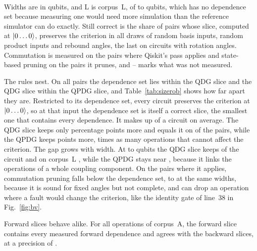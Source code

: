 \begin{table}[t]
  \centering
  \caption{Slice size by circuit width (RQ1) and slices that stay correct under other inputs (RQ2)}
  \label{tab:sizerob}
  \footnotesize\setlength{\tabcolsep}{1.9pt}\renewcommand{\arraystretch}{1.12}
  \\[3pt]
  \begin{minipage}{\columnwidth}\footnotesize
  Widths are in qubits, and L is corpus~L, of \numSubjLMinQubits{} to \numSubjLMaxQubits{} qubits, which has no dependence set because measuring one would
  need more simulation than the reference simulator can do exactly. Still correct is the share of pairs whose slice, computed at
  $\lvert 0\dots0\rangle$, preserves the criterion in all \numRobDraws{} draws of random basis inputs, random product inputs
  and rebound angles, the last on circuits with rotation angles. Commutation is measured on the \numLcqApplicable{}
  pairs where Qiskit's pass applies and state-based pruning on the \numHThreePrunedN{} pairs it prunes, and -- marks
  what was not measured.
  \end{minipage}
\end{table}

The rules nest. On all \numNestPairs{} pairs the dependence set lies within the QDG slice and the QDG slice within
the QPDG slice, and Table~\ref{tab:sizerob} shows how far apart they are. Restricted to its dependence set, every circuit
preserves the criterion at $\lvert 0\dots0\rangle$, so at that input the dependence set is itself a correct slice, the
smallest one that contains every dependence. It makes up \numDepFloor{} of a circuit on average. The QDG slice keeps only
\numLcExcess{} percentage points more and equals it on \numLcExact{} of the \numNPairs{} pairs, while the QPDG keeps
\numYzExcess{} points more, \numYzLcExcessRatio{} times as many operations that cannot affect the
criterion. The gap grows
with width. At \numWElevenLo{} to \numWElevenHi{} qubits the QDG slice keeps \numWElevenLc{} of the circuit and on
corpus~L \numCorpusLSizeLc{}, while the QPDG stays near \numCorpusLSizeYz{}, because it links the operations of a whole
coupling component. On the pairs where it applies, commutation pruning falls below the dependence set, to \numWElevenLcq{} at the same widths,
because it is sound for fixed angles but not complete, and can drop an operation where a fault would change the
criterion, like the identity gate of line~38 in Fig.~\ref{fig:bv}.

Forward slices behave alike. For all \numFdFwdOps{} operations of corpus~A, the forward slice contains every measured
forward dependence and agrees with the backward slices, at a precision of \numFdFwdPrecision{}.

